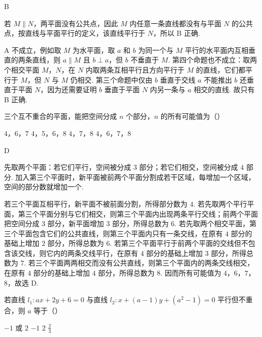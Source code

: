 \begin{answer}
B
\end{answer}

\begin{solution}
若 \(M\parallel N\)，两平面没有公共点，因此 \(M\) 内任意一条直线都没有与平面 \(N\) 的公共点，按直线与平面平行的定义，该直线平行于 \(N\)，所以 B 正确.

A 不成立，例如取 \(M\) 为水平面，取 \(a\) 和 \(b\) 为同一个与 \(M\) 平行的水平面内互相垂直的两条直线，则 \(a\parallel M\) 且 \(b\perp a\)，但 \(b\) 不垂直于 \(M\). 第四个命题也不成立：取两个相交平面 \(M\)，\(N\)，在 \(N\) 内取两条互相平行且方向平行于 \(M\) 的直线，它们都平行于 \(M\)，但 \(N\) 与 \(M\) 仍相交. 第三个命题中仅由 \(b\) 垂直于交线 \(a\) 不能推出 \(b\) 还垂直于平面 \(N\)，因为还需要证明 \(b\) 垂直于平面 \(N\) 内另一条与 \(a\) 相交的直线. 故只有 B 正确.
\end{solution}

\begin{problem}
三个互不重合的平面，能把空间分成 \(n\) 个部分，\(n\) 的所有可能值为（\quad）

\choices
    {\(4\)，\(6\)，\(7\)}
    {\(4\)，\(5\)，\(6\)，\(8\)}
    {\(4\)，\(7\)，\(8\)}
    {\(4\)，\(6\)，\(7\)，\(8\)}
\end{problem}

\begin{answer}
D
\end{answer}

\begin{solution}
先取两个平面：若它们平行，空间被分成 \(3\) 部分；若它们相交，空间被分成 \(4\) 部分. 加入第三个平面时，新平面被前两个平面分割成若干区域，每增加一个区域，空间的部分数就增加一个.

若三个平面互相平行，新平面不被前面分割，所得部分数为 \(4\). 若先取两个平行平面，第三个平面分别与它们相交，则第三个平面内出现两条平行交线；前两个平面把空间分成 \(3\) 部分，新平面增加 \(3\) 部分，所得总数为 \(6\). 若先取两个相交平面，第三个平面包含它们的公共直线，则第三个平面内只有一条交线，在原有 \(4\) 部分的基础上增加 \(2\) 部分，所得总数为 \(6\). 若第三个平面平行于前两个平面的交线但不包含该交线，则它内的两条交线平行，在原有 \(4\) 部分的基础上增加 \(3\) 部分，所得总数为 \(7\). 若三个平面两两相交而没有公共直线，则第三个平面内的两条交线相交，在原有 \(4\) 部分的基础上增加 \(4\) 部分，所得总数为 \(8\). 因而所有可能值为 \(4\)，\(6\)，\(7\)，\(8\)，故选 D.
\end{solution}

\begin{problem}
若直线 \(l_1\colon ax+2y+6=0\) 与直线 \(l_2\colon x+\left(a-1\right)y+\left(a^2-1\right)=0\) 平行但不重合，则 \(a\) 等于（\quad）

\choices
    {\(-1\) 或 \(2\)}
    {\(-1\)}
    {\(2\)}
    {\(\frac{2}{3}\)}
\end{problem}

